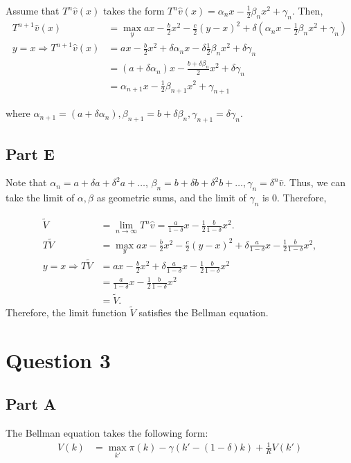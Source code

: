 \documentclass[11pt]{article} %
\begin{document}
Assume that $T^n\hat{v}(x)$ takes the form $T^n\hat{v}(x) = \alpha_n x - \frac{1}{2}\beta_n x^2 + \gamma_n.$ Then,
\begin{align*}
T^{n+1}\hat{v} (x) &= \max_y ax - \frac{b}{2}x^2 - \frac{c}{2}(y-x)^2 + \delta (\alpha_n x - \frac{1}{2}\beta_n x^2 + \gamma_n)\\
y=x \Rightarrow T^{n+1}\hat{v} (x) &= ax - \frac{b}{2}x^2 + \delta \alpha_n x - \delta \frac{1}{2}\beta_n x^2 + \delta \gamma_n\\
&= (a+\delta \alpha_n) x - \frac{b + \delta \beta_n}{2}x^2 +\delta \gamma_n\\
&= \alpha_{n+1} x - \frac{1}{2}\beta_{n+1} x^2 + \gamma_{n+1}
\end{align*}

where $\alpha_{n+1} =  (a+\delta \alpha_n) , \beta_{n+1} = b + \delta \beta_n ,  \gamma_{n+1} = \delta \gamma_n $.

\subsection{Part E}
Note that $\alpha_{n} = a + \delta a + \delta^2 a + \dots$, $\beta_n = b + \delta b + \delta^2 b + \dots, \gamma_n = \delta^n\hat{v}$. Thus, we can take the limit of $\alpha,\beta$ as geometric sums, and the limit of $\gamma_n$ is $0$. Therefore,

\begin{align*}
\tilde{V} &= \lim_{n\rightarrow \infty} T^n \hat{v} = \frac{a}{1-\delta}x - \frac{1}{2}\frac{b}{1-\delta}x^2.\\
T\tilde{V} &= \max_{y} ax - \frac{b}{2}x^2 - \frac{c}{2}(y-x)^2 + \delta \frac{a}{1-\delta}x - \frac{1}{2}\frac{b}{1-\delta}x^2,\\
y=x\Rightarrow T\tilde{V} &=  ax - \frac{b}{2}x^2 + \delta \frac{a}{1-\delta}x - \frac{1}{2}\frac{b}{1-\delta}x^2\\
&= \frac{a}{1-\delta}x - \frac{1}{2}\frac{b}{1-\delta}x^2\\
&= \tilde{V}.
\end{align*}
Therefore, the limit function $\tilde{V}$ satisfies the Bellman equation.
\section{Question 3}
\subsection{Part A}
The Bellman equation takes the following form:
\begin{align*}
V(k) &= \max_{k'} \pi (k) - \gamma(k' - (1-\delta)k) + \frac{1}{R}V(k')
\end{align*}
\end{document}

